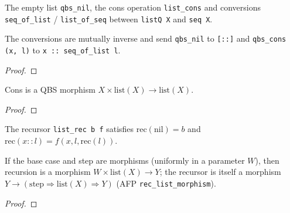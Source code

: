 \begin{definition}\label{def:qbs_cons}
  \rocqok
  The empty list \texttt{qbs\_nil}, the cons operation \texttt{list\_cons} and conversions \texttt{seq\_of\_list} / \texttt{list\_of\_seq} between \texttt{listQ X} and \texttt{seq X}.
\end{definition}

\begin{lemma}\label{lem:list_of_seqK}
  \rocqok
  The conversions are mutually inverse and send \texttt{qbs\_nil} to \texttt{[::]} and \texttt{qbs\_cons (x, l)} to \texttt{x :: seq\_of\_list l}.
\end{lemma}
\begin{proof}\rocqok\end{proof}

\begin{lemma}\label{lem:qbs_morphism_cons}
  \rocqok
  Cons is a QBS morphism $X \times \mathrm{list}(X) \to \mathrm{list}(X)$.
\end{lemma}
\begin{proof}\rocqok\end{proof}

\begin{definition}\label{def:list_rec}
  \rocqok
  The recursor \texttt{list\_rec b f} satisfies $\mathrm{rec}(\mathrm{nil}) = b$ and $\mathrm{rec}(x :: l) = f(x, l, \mathrm{rec}(l))$.
\end{definition}

\begin{theorem}\label{thm:qbs_morphism_list_rec}
  \rocqok
  If the base case and step are morphisms (uniformly in a parameter $W$), then recursion is a morphism $W \times \mathrm{list}(X) \to Y$; the recursor is itself a morphism $Y \to (\mathrm{step} \Rightarrow \mathrm{list}(X) \Rightarrow Y)$ (AFP \texttt{rec\_list\_morphism}).
\end{theorem}
\begin{proof}\rocqok\end{proof}


